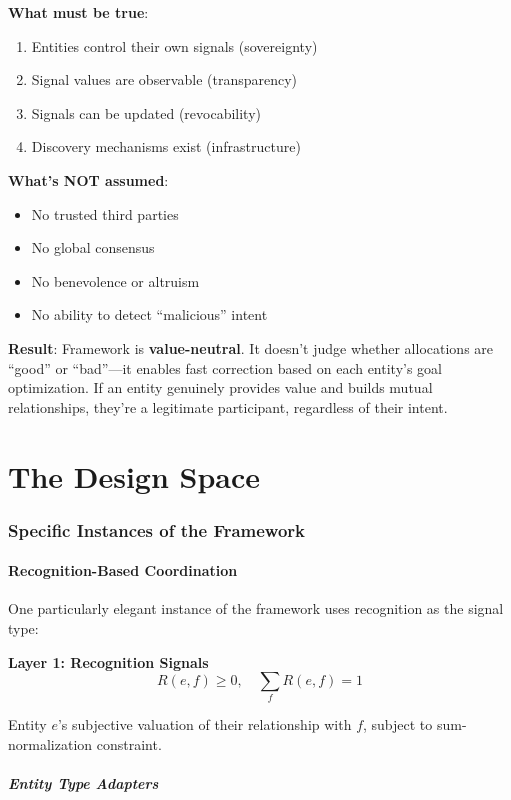\documentclass[11pt,a4paper]{article}
\theoremstyle{definition}
\theoremstyle{remark}
\begin{document}
\textbf{What must be true}:
\begin{enumerate}
\item Entities control their own signals (sovereignty)
\item Signal values are observable (transparency)
\item Signals can be updated (revocability)
\item Discovery mechanisms exist (infrastructure)
\end{enumerate}

\textbf{What's NOT assumed}:
\begin{itemize}
\item No trusted third parties
\item No global consensus
\item No benevolence or altruism
\item No ability to detect ``malicious'' intent
\end{itemize}

\textbf{Result}: Framework is \textbf{value-neutral}. It doesn't judge whether allocations are ``good'' or ``bad''—it enables fast correction based on each entity's goal optimization. If an entity genuinely provides value and builds mutual relationships, they're a legitimate participant, regardless of their intent.

\part{The Design Space}

\section{Specific Instances of the Framework}

\subsection{Recognition-Based Coordination}

One particularly elegant instance of the framework uses recognition as the signal type:

\textbf{Layer 1: Recognition Signals}
\[ R(e,f) \ge 0, \quad \sum_f R(e,f) = 1 \]

Entity $e$'s subjective valuation of their relationship with $f$, subject to sum-normalization constraint.

\subsubsection{Entity Type Adapters}
\end{document}
